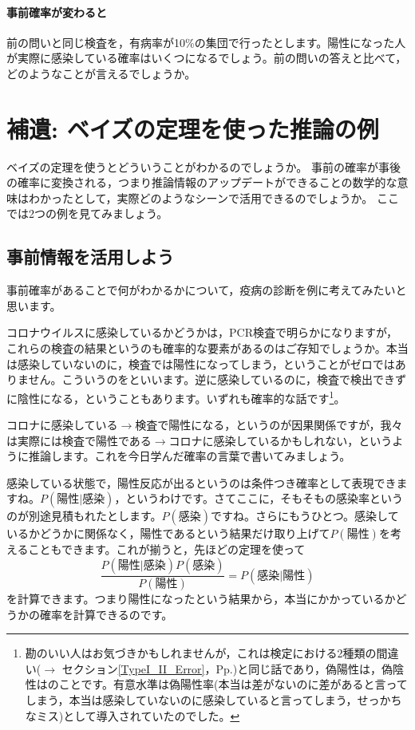 \documentclass{ltjbook}
\begin{document}
\paragraph{事前確率が変わると}前の問いと同じ検査を，有病率が10\%の集団で行ったとします。陽性になった人が実際に感染している確率はいくつになるでしょう。前の問いの答えと比べて，どのようなことが言えるでしょうか。

\section{補遺: ベイズの定理を使った推論の例}

ベイズの定理を使うとどういうことがわかるのでしょうか。
事前の確率が事後の確率に変換される，つまり推論情報のアップデートができることの数学的な意味はわかったとして，実際どのようなシーンで活用できるのでしょうか。
ここでは2つの例を見てみましょう。

\subsection{事前情報を活用しよう}
事前確率があることで何がわかるかについて，疫病の診断を例に考えてみたいと思います。

コロナウイルスに感染しているかどうかは，PCR検査で明らかになりますが，これらの検査の結果というのも確率的な要素があるのはご存知でしょうか。本当は感染していないのに，検査では陽性になってしまう，ということがゼロではありません。こういうのをといいます。逆に感染しているのに，検査で検出できずに陰性になる，ということもあります。いずれも確率的な話です\footnote{勘のいい人はお気づきかもしれませんが，これは検定における2種類の間違い($\to$ セクション\ref{TypeI_II_Error}，Pp.\pageref{TypeI_II_Error})と同じ話であり，偽陽性は，偽陰性はのことです。有意水準は偽陽性率(本当は差がないのに差があると言ってしまう，本当は感染していないのに感染していると言ってしまう，せっかちなミス)として導入されていたのでした。}。

コロナに感染している$\to$検査で陽性になる，というのが因果関係ですが，我々は実際には検査で陽性である$\to$コロナに感染しているかもしれない，というように推論します。これを今日学んだ確率の言葉で書いてみましょう。

感染している状態で，陽性反応が出るというのは条件つき確率として表現できますね。$P(\mbox{陽性}|\mbox{感染})$，というわけです。さてここに，そもそもの感染率というのが別途見積もれたとします。$P(\mbox{感染})$ですね。さらにもうひとつ。感染しているかどうかに関係なく，陽性であるという結果だけ取り上げて$P(\mbox{陽性})$を考えることもできます。これが揃うと，先ほどの定理を使って
\[ \frac{P(\mbox{陽性}|\mbox{感染})P(\mbox{感染})}{P(\mbox{陽性})} = P(\mbox{感染}|\mbox{陽性})\]
を計算できます。つまり陽性になったという結果から，本当にかかっているかどうかの確率を計算できるのです。
\end{document}
